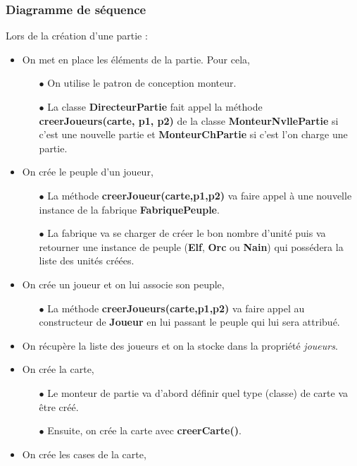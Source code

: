 \documentclass[a4paper,11pt]{article}
\begin{document}
\subsubsection{Diagramme de séquence}
Lors de la création d'une partie :
\begin{itemize}
\item On met en place les éléments de la partie. Pour cela,
	\begin{itemize}
	\item[$\bullet$] On utilise le patron de conception monteur.
	\item[$\bullet$] La classe \textbf{DirecteurPartie} fait appel la méthode  \textbf{creerJoueurs(carte, p1, p2)} de la classe \textbf{MonteurNvllePartie} si c'est une nouvelle partie et \textbf{MonteurChPartie} si c'est l'on charge une partie.
	\end{itemize}
\item On crée le peuple d'un joueur,
	\begin{itemize}
	\item[$\bullet$] La méthode \textbf{creerJoueur(carte,p1,p2)} va faire appel à une nouvelle instance de la fabrique \textbf{FabriquePeuple}.
	\item[$\bullet$] La fabrique va se charger de créer le bon nombre d'unité puis va retourner une instance de peuple (\textbf{Elf}, \textbf{Orc} ou \textbf{Nain}) qui possédera la liste des unités créées.
	\end{itemize}
\item On crée un joueur et on lui associe son peuple, 
	\begin{itemize}
	\item[$\bullet$] La méthode \textbf{creerJoueurs(carte,p1,p2)} va faire appel au constructeur de \textbf{Joueur} en lui passant le peuple qui lui sera attribué.
	\end{itemize}
\item On récupère la liste des joueurs et on la stocke dans la propriété \textit{joueurs}.
\item On crée la carte,
	\begin{itemize}
	\item[$\bullet$] Le monteur de partie va d'abord définir quel type (classe) de carte va être créé.
	\item[$\bullet$]  Ensuite, on crée la carte avec \textbf{creerCarte()}.
	\end{itemize}
\item On crée les cases de la carte,
	\begin{itemize}

\end{itemize}
\end{itemize}
\end{document}
